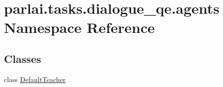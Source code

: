 \hypertarget{namespaceparlai_1_1tasks_1_1dialogue__qe_1_1agents}{}\section{parlai.\+tasks.\+dialogue\+\_\+qe.\+agents Namespace Reference}
\label{namespaceparlai_1_1tasks_1_1dialogue__qe_1_1agents}
\subsection*{Classes}
\begin{DoxyCompactItemize}
\item 
class \hyperlink{classparlai_1_1tasks_1_1dialogue__qe_1_1agents_1_1DefaultTeacher}{Default\+Teacher}
\end{DoxyCompactItemize}
